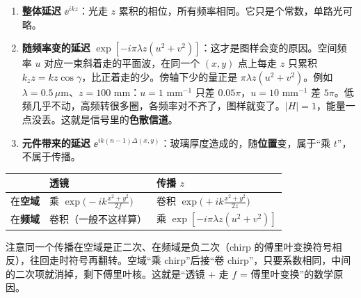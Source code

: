 \begin{enumerate}
\item \textbf{整体延迟} $\ee^{ikz}$：光走 $z$ 累积的相位，所有频率相同。它只是个常数，单路光可略。
\item \textbf{随频率变的延迟} $\exp[-i\pi\lambda z(u^2+v^2)]$：这才是图样会变的原因。空间频率 $u$ 对应一束斜着走的平面波，在同一个 $(x,y)$ 点上每走 $z$ 只累积 $k_zz=kz\cos\gamma$，比正着走的少。傍轴下少的量正是 $\pi\lambda z(u^2+v^2)$。例如 $\lambda=0.5\,\mu$m、$z=100$ mm：$u=1$ mm$^{-1}$ 只差 $0.05\pi$，$u=10$ mm$^{-1}$ 差 $5\pi$。低频几乎不动，高频转很多圈，各频率对不齐了，图样就变了。$|H|=1$，能量一点没丢。这就是信号里的\textbf{色散信道}。
\item \textbf{元件带来的延迟} $\ee^{ik(n-1)\Delta(x,y)}$：玻璃厚度造成的，随\textbf{位置}变，属于“乘 $t$”，不属于传播。
\end{enumerate}

\begin{center}\small\renewcommand{\arraystretch}{1.4}
\begin{tabular}{@{}P{4.6cm}P{5.6cm}P{6.2cm}@{}}
\toprule
 & 透镜 & 传播 $z$\\ \midrule
在\textbf{空域} & 乘 $\exp\!\big(-ik\frac{x^2+y^2}{2f}\big)$ & 卷积 $\exp\!\big(+ik\frac{x^2+y^2}{2z}\big)$\\
在\textbf{频域} & 卷积（一般不这样算） & 乘 $\exp[-i\pi\lambda z(u^2+v^2)]$\\
\bottomrule
\end{tabular}
\end{center}
注意同一个传播在空域是正二次、在频域是负二次（chirp 的傅里叶变换符号相反），往回走时符号再翻转。空域“乘 chirp”后接“卷 chirp”，只要系数相同，中间的二次项就消掉，剩下傅里叶核。这就是“透镜 + 走 $f$ = 傅里叶变换”的数学原因。


